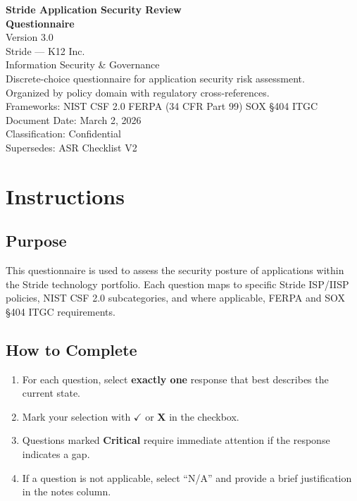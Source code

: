 \documentclass[11pt,landscape]{article}
\begin{document}
\begin{titlepage}
\vspace*{2cm}
\begin{center}
{\Huge\bfseries\textcolor{stridegreen}{Stride Application Security Review}}\\[0.3cm]
{\Huge\bfseries\textcolor{stridegreen}{Questionnaire}}\\[0.5cm]
{\LARGE Version 3.0}\\[1cm]
{\large Stride — K12 Inc.}\\[0.3cm]
{\large Information Security \& Governance}\\[2cm]
{\normalsize Discrete-choice questionnaire for application security risk assessment.}\\
{\normalsize Organized by policy domain with regulatory cross-references.}\\[1cm]
{\normalsize Frameworks: NIST CSF 2.0 \textbar{} FERPA (34 CFR Part 99) \textbar{} SOX §404 ITGC}\\[2cm]
{\small Document Date: March 2, 2026}\\
{\small Classification: Confidential}\\
{\small Supersedes: ASR Checklist V2}\\
\end{center}
\end{titlepage}

\tableofcontents
\newpage

\section{Instructions}

\subsection{Purpose}
This questionnaire is used to assess the security posture of applications within the Stride technology portfolio. Each question maps to specific Stride ISP/IISP policies, NIST CSF 2.0 subcategories, and where applicable, FERPA and SOX §404 ITGC requirements.

\subsection{How to Complete}
\begin{enumerate}
    \item For each question, select \textbf{exactly one} response that best describes the current state.
    \item Mark your selection with \textbf{$\checkmark$} or \textbf{X} in the checkbox.
    \item Questions marked \textbf{Critical} require immediate attention if the response indicates a gap.
    \item If a question is not applicable, select ``N/A'' and provide a brief justification in the notes column.
\end{enumerate}
\end{document}
